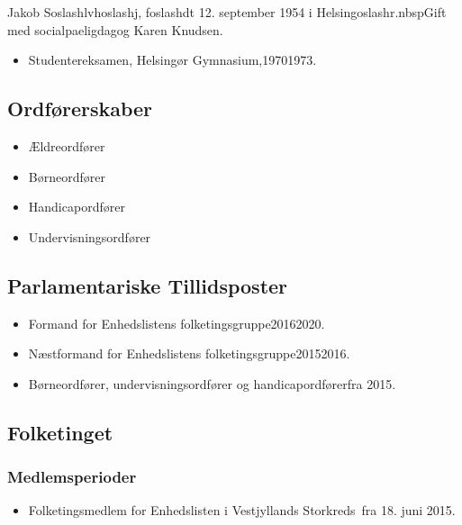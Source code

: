 \documentclass[11pt, a4paper]{awesome-cv}
\begin{document}
\makecvheader[R]
\makelettertitle
\begin{cvletter}
Jakob Soslashlvhoslashj, foslashdt 12. september 1954 i Helsingoslashr.nbspGift med socialpaeligdagog Karen Knudsen.

\begin{itemize}
\item Studentereksamen, Helsingør Gymnasium,19701973.
\end{itemize}
\subsection*{Ordførerskaber}
\begin{itemize}
\item Ældreordfører
\item Børneordfører
\item Handicapordfører
\item Undervisningsordfører
\end{itemize}
\subsection*{Parlamentariske Tillidsposter}
\begin{itemize}
\item Formand for Enhedslistens folketingsgruppe20162020.
\item Næstformand for Enhedslistens folketingsgruppe20152016.
\item Børneordfører, undervisningsordfører og handicapordførerfra 2015.
\end{itemize}
\subsection*{Folketinget}
\subsubsection*{Medlemsperioder}
\begin{itemize}
\item Folketingsmedlem for Enhedslisten i Vestjyllands Storkreds fra 18. juni 2015.
\end{itemize}

\end{cvletter}
\end{document}
